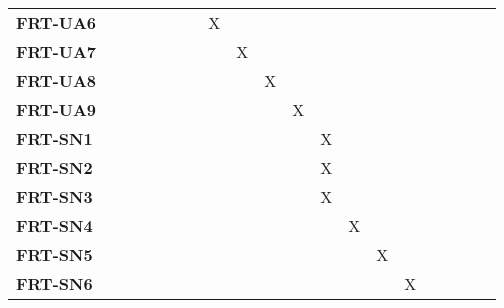 \documentclass[12pt, titlepage]{article}
\begin{document}
\begin{landscape}
\begin{longtable}{|l|cccccccccccccccc|}
  \textbf{FRT-UA6}  & ~              & ~              & ~              & ~              & X              & ~              & ~              & ~              & ~              & ~              & ~              & ~              & ~              \\
  \textbf{FRT-UA7}  & ~              & ~              & ~              & ~              & ~              & X              & ~              & ~              & ~              & ~              & ~              & ~              & ~              \\
  \textbf{FRT-UA8}  & ~              & ~              & ~              & ~              & ~              & ~              & X              & ~              & ~              & ~              & ~              & ~              & ~              \\
  \textbf{FRT-UA9}  & ~              & ~              & ~              & ~              & ~              & ~              & ~              & X              & ~              & ~              & ~              & ~              & ~              \\
  \textbf{FRT-SN1}  & ~              & ~              & ~              & ~              & ~              & ~              & ~              & ~              & X              & ~              & ~              & ~              & ~              \\
  \textbf{FRT-SN2}  & ~              & ~              & ~              & ~              & ~              & ~              & ~              & ~              & X              & ~              & ~              & ~              & ~              \\
  \textbf{FRT-SN3}  & ~              & ~              & ~              & ~              & ~              & ~              & ~              & ~              & X              & ~              & ~              & ~              & ~              \\
  \textbf{FRT-SN4}  & ~              & ~              & ~              & ~              & ~              & ~              & ~              & ~              & ~              & X              & ~              & ~              & ~              \\
  \textbf{FRT-SN5}  & ~              & ~              & ~              & ~              & ~              & ~              & ~              & ~              & ~              & ~              & X              & ~              & ~              \\
  \textbf{FRT-SN6}  & ~              & ~              & ~              & ~              & ~              & ~              & ~              & ~              & ~              & ~              & ~              & X              & ~              \\

\end{longtable}
\end{landscape}
\end{document}
